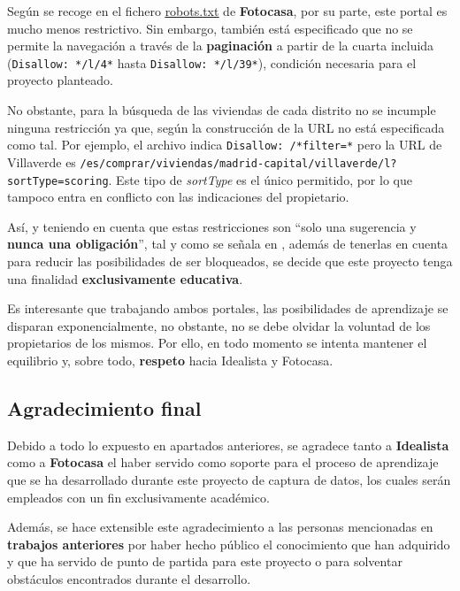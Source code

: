 \documentclass[12pt]{article}
\begin{document}
Según se recoge en el fichero \href{https://www.fotocasa.es/robots.txt}{\underline{robots.txt}} de \textbf{Fotocasa}, por su parte, este portal es mucho menos restrictivo. Sin embargo, también está especificado que no se permite la navegación a través de la \textbf{paginación} a partir de la cuarta incluida (\verb|Disallow: */l/4*| hasta \verb|Disallow: */l/39*|), condición necesaria para el proyecto planteado.

No obstante, para la búsqueda de las viviendas de cada distrito no se incumple ninguna restricción ya que, según la construcción de la URL no está especificada como tal. Por ejemplo, el archivo indica \verb|Disallow: /*filter=*| pero la URL de Villaverde es \verb|/es/comprar/viviendas/madrid-capital/villaverde/l?sortType=scoring|. Este tipo de \textit{sortType} es el único permitido, por lo que tampoco entra en conflicto con las indicaciones del propietario. 

Así, y teniendo en cuenta que estas restricciones son ``solo una sugerencia y \textbf{nunca una obligación}'', tal y como se señala en \cite{tip2}, además de tenerlas en cuenta para reducir las posibilidades de ser bloqueados, se decide que este proyecto tenga una finalidad \textbf{exclusivamente educativa}. 

Es interesante que trabajando ambos portales, las posibilidades de aprendizaje se disparan exponencialmente, no obstante, no se debe olvidar la voluntad de los propietarios de los mismos. Por ello, en todo momento se intenta mantener el equilibrio y, sobre todo, \textbf{respeto} hacia Idealista y Fotocasa. 

\vspace{-1.5em}\subsection*{Agradecimiento final}\vspace{-1.0em}

Debido a todo lo expuesto en apartados anteriores, se agradece tanto a \textbf{Idealista} como a \textbf{Fotocasa} el haber servido como soporte para el proceso de aprendizaje que se ha desarrollado durante este proyecto de captura de datos, los cuales serán empleados con un fin exclusivamente académico. 

Además, se hace extensible este agradecimiento a las personas mencionadas en \textbf{trabajos anteriores} por haber hecho público el conocimiento que han adquirido y que ha servido de punto de partida para este proyecto o para solventar obstáculos encontrados durante el desarrollo. 
\end{document}
